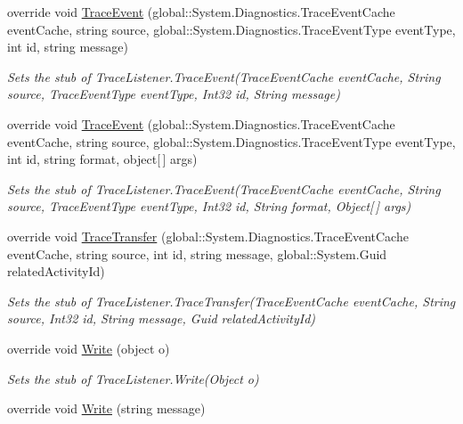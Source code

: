 \begin{DoxyCompactItemize}
override void \hyperlink{class_system_1_1_diagnostics_1_1_fakes_1_1_stub_trace_listener_a148d1e94c95c328ecf9035919ee958e6}{Trace\-Event} (global\-::\-System.\-Diagnostics.\-Trace\-Event\-Cache event\-Cache, string source, global\-::\-System.\-Diagnostics.\-Trace\-Event\-Type event\-Type, int id, string message)
\begin{DoxyCompactList}\small\item\em Sets the stub of Trace\-Listener.\-Trace\-Event(\-Trace\-Event\-Cache event\-Cache, String source, Trace\-Event\-Type event\-Type, Int32 id, String message)\end{DoxyCompactList}\item 
override void \hyperlink{class_system_1_1_diagnostics_1_1_fakes_1_1_stub_trace_listener_a3f3d04c3e90be1338c3affcdadf7b881}{Trace\-Event} (global\-::\-System.\-Diagnostics.\-Trace\-Event\-Cache event\-Cache, string source, global\-::\-System.\-Diagnostics.\-Trace\-Event\-Type event\-Type, int id, string format, object\mbox{[}$\,$\mbox{]} args)
\begin{DoxyCompactList}\small\item\em Sets the stub of Trace\-Listener.\-Trace\-Event(\-Trace\-Event\-Cache event\-Cache, String source, Trace\-Event\-Type event\-Type, Int32 id, String format, Object\mbox{[}$\,$\mbox{]} args)\end{DoxyCompactList}\item 
override void \hyperlink{class_system_1_1_diagnostics_1_1_fakes_1_1_stub_trace_listener_a13ca770d2cf4bb4e36fe60602bf48fed}{Trace\-Transfer} (global\-::\-System.\-Diagnostics.\-Trace\-Event\-Cache event\-Cache, string source, int id, string message, global\-::\-System.\-Guid related\-Activity\-Id)
\begin{DoxyCompactList}\small\item\em Sets the stub of Trace\-Listener.\-Trace\-Transfer(\-Trace\-Event\-Cache event\-Cache, String source, Int32 id, String message, Guid related\-Activity\-Id)\end{DoxyCompactList}\item 
override void \hyperlink{class_system_1_1_diagnostics_1_1_fakes_1_1_stub_trace_listener_a9940c883b5c98bd5c28f0c0f906653b3}{Write} (object o)
\begin{DoxyCompactList}\small\item\em Sets the stub of Trace\-Listener.\-Write(\-Object o)\end{DoxyCompactList}\item 
override void \hyperlink{class_system_1_1_diagnostics_1_1_fakes_1_1_stub_trace_listener_a41eb0c6933d4e3dd7a10e481fcaa27a7}{Write} (string message)

\end{DoxyCompactItemize}
